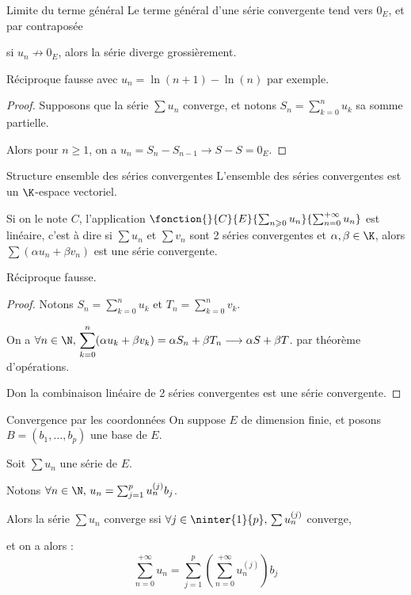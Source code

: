 \begin{theoreme}{Limite du terme général}{}
    Le terme général d'une série convergente tend vers $0_E$, et par contraposée 
    
    si $u_n \not \longrightarrow 0_E$, alors la série diverge grossièrement. 
\end{theoreme}

\begin{remarque}
    Réciproque fausse avec $u_n = \ln(n + 1) - \ln(n)$ par exemple. 
\end{remarque}


\begin{proof}
    Supposons que la série $\sum u_n$ converge, et notons $\displaystyle S_n = \sum_{k=0}^n u_k$ sa somme partielle.

    Alors pour $n \geqslant 1$, on a $u_n = S_n - S_{n-1} \longrightarrow S - S = 0_E$.
\end{proof}

\begin{proposition}{Structure ensemble des séries convergentes}{}
    L'ensemble des séries convergentes est un $\K$-espace vectoriel.

    Si on le note $C$, l'application $\fonction{}{C}{E}{\sum_{n \geqslant 0} u_n}{\sum_{n = 0}^{+\infty} u_n}$ 
    est linéaire, c'est à dire si $\sum u_n$ et $\sum v_n$ sont 2 séries convergentes et
    $\alpha, \beta \in \K$, alors $\sum (\alpha u_n + \beta v_n)$ est une série convergente.
\end{proposition}

\begin{remarque}
    Réciproque fausse.
\end{remarque}

\begin{proof}
    Notons $S_n = \displaystyle \sum_{k=0}^n u_k$ et $T_n = \displaystyle \sum_{k=0}^n v_k$.

    On a $\displaystyle \forall n \in \N, \, \sum_{k=0}^n (\alpha u_k + \beta v_k) = \alpha S_n + \beta T_n \longrightarrow \alpha S + \beta T$.
    par théorème d'opérations. 

    Don la combinaison linéaire de 2 séries convergentes est une série convergente.
\end{proof}


\begin{proposition}{Convergence par les coordonnées}{}
    On suppose $E$ de dimension finie, et posons $B = (b_1, \ldots, b_p)$ une base de $E$.

    Soit $\sum u_n$ une série de $E$. 

    Notons $\forall n \in \N, \, u_n = \sum_{j = 1 }^p u_n^{(j)} b_j$. 

    Alors la série $\sum u_n$ converge ssi $\forall j \in \ninter{1}{p}, \, \sum u_n^{(j)}$ converge, 

    et on a alors :
    $$\sum_{n = 0}^{+\infty} u_n = \sum_{j = 1}^p \left( \sum_{n = 0}^{+\infty} u_n^{(j)} \right) b_j$$
\end{proposition}

